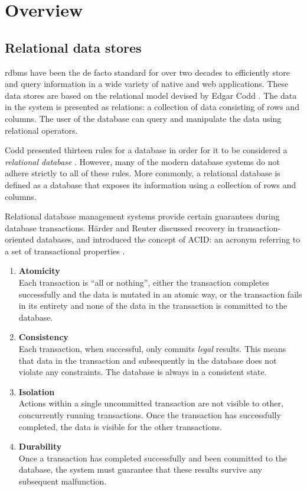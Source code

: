 \chapter{Overview}
\label{ch:overview}

\section{Relational data stores}
\label{sec:relational-data-stores}

\Gls{rdbms} have been the de facto standard for over two decades to efficiently store and query information in a wide variety of native and web applications.
These data stores are based on the relational model devised by Edgar Codd \autocite{Codd1970}.
The data in the system is presented as relations: a collection of data consisting of rows and columns.
The user of the database can query and manipulate the data using relational operators.

Codd presented thirteen rules for a database in order for it to be considered a \textit{relational database} \autocite{Codd1985}.
However, many of the modern database systems do not adhere strictly to all of these rules.
More commonly, a relational database is defined as a database that exposes its information using a collection of rows and columns.

Relational database management systems provide certain guarantees during database transactions.
H\"arder and Reuter discussed recovery in transaction-oriented databases, and introduced the concept of ACID: an acronym referring to a set of transactional properties \autocite{Harder1983}.

\begin{enumerate}
  \item \textbf{Atomicity} \\ Each transaction is ``all or nothing'', either the transaction completes successfully and the data is mutated in an atomic way, or the transaction fails in its entirety and none of the data in the transaction is committed to the database.
  \item \textbf{Consistency} \\ Each transaction, when successful, only commits \textit{legal} results.
        This means that data in the transaction and subsequently in the database does not violate any constraints. The database is always in a consistent state.
  \item \textbf{Isolation} \\ Actions within a single uncommitted transaction are not visible to other, concurrently running transactions.
        Once the transaction has successfully completed, the data is visible for the other transactions.
  \item \textbf{Durability} \\ Once a transaction has completed successfully and been committed to the database, the system must guarantee that these results survive any subsequent malfunction.
\end{enumerate}

